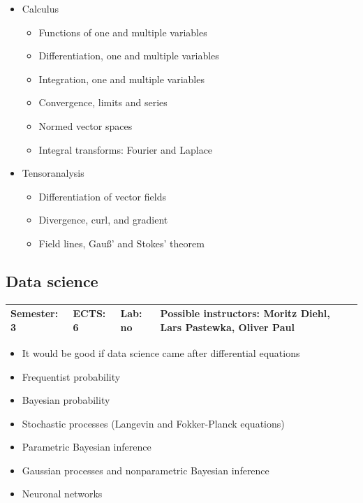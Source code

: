 \documentclass[12pt,twoside,fleqn,a4paper]{article}
\newcommand{\lp}[1]{{\color{red} #1}}  %
\begin{document}
\begin{itemize}
\setlength\itemsep{0cm}
\item Calculus
\begin{itemize}
    \item Functions of one and multiple variables
    \item Differentiation, one and multiple variables
    \item Integration, one and multiple variables
    \item Convergence, limits and series
    \item Normed vector spaces
    \item Integral transforms: Fourier and Laplace
\end{itemize}
\item Tensoranalysis
\begin{itemize}
    \item Differentiation of vector fields
    \item Divergence, curl, and gradient
    \item Field lines, Gauß' and Stokes' theorem
\end{itemize}
\end{itemize}


\subsection{Data science}
\begin{tabular}{llll} \hline
\textbf{Semester:} 3 & \textbf{ECTS:} 6 & \textbf{Lab:} no & \textbf{Possible instructors:} Moritz Diehl, Lars Pastewka, Oliver Paul \\
\hline
\end{tabular}

\begin{itemize}
\setlength\itemsep{0cm}
\item \lp{It would be good if data science came after differential equations}
\item Frequentist probability
\item Bayesian probability
\item Stochastic processes (Langevin and Fokker-Planck equations)
\item Parametric Bayesian inference
\item Gaussian processes and nonparametric Bayesian inference
\item Neuronal networks
\end{itemize}
\end{document}
